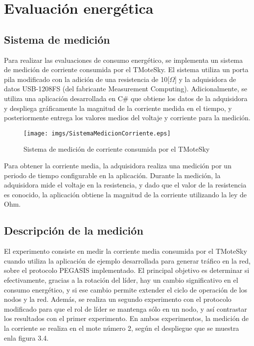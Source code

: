 \section{Evaluación energética}

\subsection{Sistema de medición}
Para realizar las evaluaciones de consumo energético, se implementa un sistema de medición de corriente consumida por el TMoteSky. El sistema utiliza un porta pila modificado con la adición de una resistencia de 10[$\Omega$] y la adquisidora de datos USB-1208FS (del fabricante Measurement Computing). Adicionalmente, se utiliza una aplicación desarrollada en C\# que obtiene los datos de la adquisidora y despliega gráficamente la magnitud de la corriente medida en el tiempo, y posteriormente entrega los valores medios del voltaje y corriente para la medición.

\begin{figure}[H]
  \centering
 \texttt{[image: imgs/SistemaMedicionCorriente.eps]}
 \caption{Sistema de medición de corriente consumida por el TMoteSky}
\end{figure}

Para obtener la corriente media, la adquisidora realiza una medición por un periodo de tiempo configurable en la aplicación. Durante la medición, la adquisidora mide el voltaje en la resistencia, y dado que el valor de la resistencia es conocido, la aplicación obtiene la magnitud de la corriente utilizando la ley de Ohm. \\

\subsection{Descripción de la medición}
El experimento consiste en medir la corriente media consumida por el TMoteSky cuando utiliza la aplicación de ejemplo desarrollada para generar tráfico en la red, sobre el protocolo PEGASIS implementado. El principal objetivo es determinar si efectivamente, gracias a la rotación del líder,  hay un cambio significativo en el consumo energético, y si ese cambio permite extender el ciclo de operación de los nodos y la red. Además, se realiza un segundo experimento con el protocolo modificado para que el rol de líder se mantenga sólo en un nodo, y así contrastar los resultados con el primer experimento. En ambos experimentos, la medición de la corriente se realiza en el mote número 2, según el despliegue que se muestra enla figura 3.4. \\


